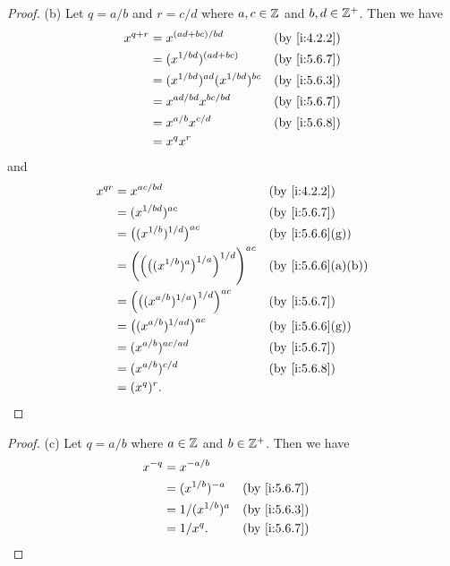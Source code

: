 \begin{proof}{(b)}
  Let \(q = a / b\) and \(r = c / d\) where \(a, c \in \mathbb{Z}\) and \(b, d \in \mathbb{Z}^+\).
  Then we have
  \begin{align*}
    x^{q + r} & = x^{(ad + bc) / bd}                  &  & \by{i:4.2.2}                \\
              & = (x^{1 / bd})^{(ad + bc)}            &  & \by{i:5.6.7}                \\
              & = (x^{1 / bd})^{ad} (x^{1 / bd})^{bc} &  & \by{i:5.6.3}                \\
              & = x^{ad / bd} x^{bc / bd}             &  & \text{(by  \cref{i:5.6.7})} \\
              & = x^{a / b} x^{c / d}                 &  & \by{i:5.6.8}                \\
              & = x^q x^r
  \end{align*}
  and
  \begin{align*}
    x^{qr} & = x^{ac / bd}                                                        &  & \by{i:4.2.2}      \\
           & = (x^{1 / bd})^{ac}                                                  &  & \by{i:5.6.7}      \\
           & = \big((x^{1 / b})^{1 / d}\big)^{ac}                                 &  & \by{i:5.6.6}[g]   \\
           & = \bigg(\Big(\big((x^{1 / b})^a\big)^{1 / a}\Big)^{1 / d}\Bigg)^{ac} &  & \by{i:5.6.6}[a,b] \\
           & = \Big(\big((x^{a / b})^{1 / a}\big)^{1 / d}\Big)^{ac}               &  & \by{i:5.6.7}      \\
           & = \big((x^{a / b})^{1 / ad}\big)^{ac}                                &  & \by{i:5.6.6}[g]   \\
           & = (x^{a / b})^{ac / ad}                                              &  & \by{i:5.6.7}      \\
           & = (x^{a / b})^{c / d}                                                &  & \by{i:5.6.8}      \\
           & = (x^q)^r.
  \end{align*}
\end{proof}

\begin{proof}{(c)}
  Let \(q = a / b\) where \(a \in \mathbb{Z}\) and \(b \in \mathbb{Z}^+\).
  Then we have
  \begin{align*}
    x^{-q} & = x^{-a / b}                          \\
           & = (x^{1 / b})^{-a}  &  & \by{i:5.6.7} \\
           & = 1 / (x^{1 / b})^a &  & \by{i:5.6.3} \\
           & = 1 / x^q.          &  & \by{i:5.6.7}
  \end{align*}
\end{proof}

